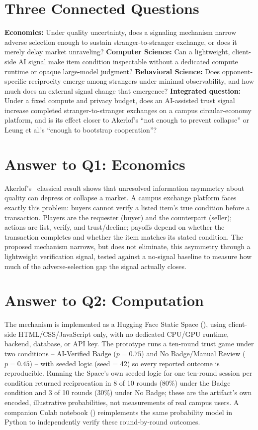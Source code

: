 \section{Three Connected Questions}
\textbf{Economics:} Under quality uncertainty, does a signaling mechanism narrow adverse selection enough to sustain stranger-to-stranger exchange, or does it merely delay market unraveling? \textbf{Computer Science:} Can a lightweight, client-side AI signal make item condition inspectable without a dedicated compute runtime or opaque large-model judgment? \textbf{Behavioral Science:} Does opponent-specific reciprocity emerge among strangers under minimal observability, and how much does an external signal change that emergence? \textbf{Integrated question:} Under a fixed compute and privacy budget, does an AI-assisted trust signal increase completed stranger-to-stranger exchanges on a campus circular-economy platform, and is its effect closer to Akerlof's ``not enough to prevent collapse'' or Leung et al.'s ``enough to bootstrap cooperation''?

\section{Answer to Q1: Economics}
Akerlof's~\cite{akerlof1970} classical result shows that unresolved information asymmetry about quality can depress or collapse a market. A campus exchange platform faces exactly this problem: buyers cannot verify a listed item's true condition before a transaction. Players are the requester (buyer) and the counterpart (seller); actions are list, verify, and trust/decline; payoffs depend on whether the transaction completes and whether the item matches its stated condition. The proposed mechanism narrows, but does not eliminate, this asymmetry through a lightweight verification signal, tested against a no-signal baseline to measure how much of the adverse-selection gap the signal actually closes.

\section{Answer to Q2: Computation}
The mechanism is implemented as a Hugging Face Static Space (\DemoLink), using client-side HTML/CSS/JavaScript only, with no dedicated CPU/GPU runtime, backend, database, or API key. The prototype runs a ten-round trust game under two conditions -- AI-Verified Badge ($p=0.75$) and No Badge/Manual Review ($p=0.45$) -- with seeded logic (seed = 42) so every reported outcome is reproducible. Running the Space's own seeded logic for one ten-round session per condition returned reciprocation in 8 of 10 rounds (80\%) under the Badge condition and 3 of 10 rounds (30\%) under No Badge; these are the artifact's own encoded, illustrative probabilities, not measurements of real campus users. A companion Colab notebook (\ColabLink) reimplements the same probability model in Python to independently verify these round-by-round outcomes.

